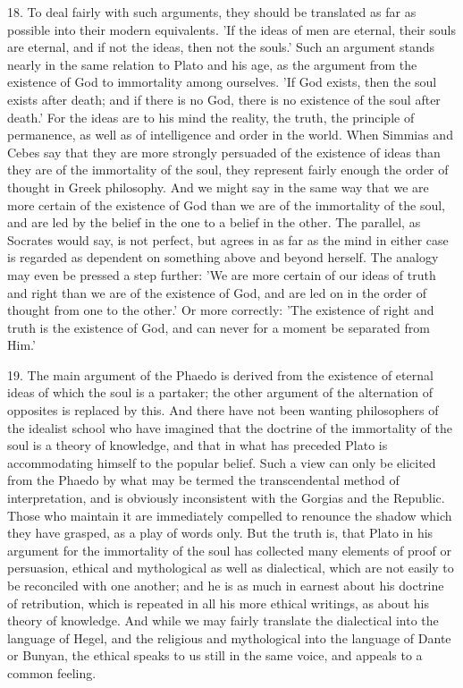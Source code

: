 18. To deal fairly with such arguments, they should be translated as far
as possible into their modern equivalents. 'If the ideas of men are
eternal, their souls are eternal, and if not the ideas, then not the
souls.' Such an argument stands nearly in the same relation to Plato and
his age, as the argument from the existence of God to immortality among
ourselves. 'If God exists, then the soul exists after death; and if there
is no God, there is no existence of the soul after death.' For the ideas
are to his mind the reality, the truth, the principle of permanence, as
well as of intelligence and order in the world. When Simmias and Cebes say
that they are more strongly persuaded of the existence of ideas than they
are of the immortality of the soul, they represent fairly enough the order
of thought in Greek philosophy. And we might say in the same way that we
are more certain of the existence of God than we are of the immortality of
the soul, and are led by the belief in the one to a belief in the other.
The parallel, as Socrates would say, is not perfect, but agrees in as far
as the mind in either case is regarded as dependent on something above and
beyond herself. The analogy may even be pressed a step further: 'We are
more certain of our ideas of truth and right than we are of the existence
of God, and are led on in the order of thought from one to the other.' Or
more correctly: 'The existence of right and truth is the existence of God,
and can never for a moment be separated from Him.'

19. The main argument of the Phaedo is derived from the existence of
eternal ideas of which the soul is a partaker; the other argument of the
alternation of opposites is replaced by this. And there have not been
wanting philosophers of the idealist school who have imagined that the
doctrine of the immortality of the soul is a theory of knowledge, and that
in what has preceded Plato is accommodating himself to the popular belief.
Such a view can only be elicited from the Phaedo by what may be termed the
transcendental method of interpretation, and is obviously inconsistent
with the Gorgias and the Republic. Those who maintain it are immediately
compelled to renounce the shadow which they have grasped, as a play of
words only. But the truth is, that Plato in his argument for the
immortality of the soul has collected many elements of proof or
persuasion, ethical and mythological as well as dialectical, which are not
easily to be reconciled with one another; and he is as much in earnest
about his doctrine of retribution, which is repeated in all his more
ethical writings, as about his theory of knowledge. And while we may
fairly translate the dialectical into the language of Hegel, and the
religious and mythological into the language of Dante or Bunyan, the
ethical speaks to us still in the same voice, and appeals to a common
feeling.

